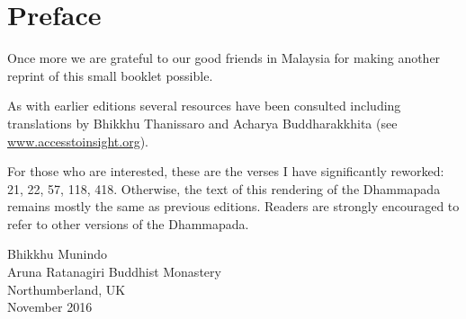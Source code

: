 \chapter[Preface to the fifth edition (2016)]{Preface}

Once more we are grateful to our good friends in Malaysia for making another
reprint of this small booklet possible.

As with earlier editions several resources have been consulted including 
translations by Bhikkhu Thanissaro and Acharya Buddharakkhita 
(see \href{http://accesstoinsight.org}{www.accesstoinsight.org}).

For those who are interested, these are the verses I have significantly
reworked: 21, 22, 57, 118, 418. Otherwise, the text of this rendering of the
Dhammapada remains mostly the same as previous editions. Readers are strongly
encouraged to refer to other versions of the Dhammapada.

\bigskip

{\raggedleft
Bhikkhu Munindo\\
Aruna Ratanagiri Buddhist Monastery\\
Northumberland, UK\\
November 2016
\par}

